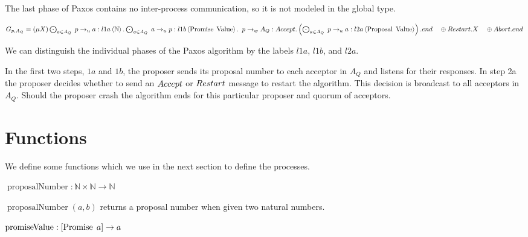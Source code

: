 The last phase of Paxos contains no inter-process communication, so it is not modeled in the global type.

$G_{p, A_Q} = \left(\mu X\right) \bigodot_{a \in A_Q}\; p \to_u a : l1a \left\langle \mathbb{N} \right\rangle . \bigodot_{a \in A_Q}\; a \to_u p : l1b \left\langle \operatorname{Promise}\; \operatorname{Value} \right\rangle .\\
\hspace*{0.5em}p \to_w A_Q : \mathnormal{Accept}.\left(\bigodot_{a \in A_Q}\; p \to_u a : l2a \left\langle \operatorname{Proposal}\; \operatorname{Value} \right\rangle\right).end\\
\hspace*{1em}\oplus \mathnormal{Restart}.X\\
\hspace*{1em}\oplus \mathnormal{Abort}.end$

We can distinguish the individual phases of the Paxos algorithm by the labels $l1a$, $l1b$, and $l2a$.

In the first two steps, $1a$ and $1b$, the proposer sends its proposal number to each acceptor in $A_Q$ and listens for their responses.
In step 2a the proposer decides whether to send an $\mathnormal{Accept}$ or $\mathnormal{Restart}$ message to restart the algorithm.
This decision is broadcast to all acceptors in $A_Q$.
Should the proposer crash the algorithm ends for this particular proposer and quorum of acceptors.

\section{Functions}
We define some functions which we use in the next section to define the processes.

\newcommand{\prNumber}[2]{\operatorname{proposalNumber}\left( #1, #2 \right)}
\newcommand{\promValue}[1]{\operatorname{promiseValue}\left(#1\right)}
\newcommand{\anyNack}[1]{\operatorname{anyNack}\left(#1\right)}
\newcommand{\promiseCount}[1]{\operatorname{promiseCount}\left(#1\right)}
\newcommand{\greaterThan}[2]{\operatorname{gt}\left(#1, #2\right)}
\newcommand{\greaterEqual}[2]{\operatorname{ge}\left(#1, #2\right)}
\newcommand{\nFromProposal}[1]{\operatorname{nFromProposal}\left(#1 \right)}
\newcommand{\genAq}[3]{\operatorname{genA_Q}\left(#1, #2, #3\right)}
\newcommand{\update}[2]{\operatorname{update} \left(#1, #2\right)}

$\operatorname{proposalNumber} : \mathbb{N} \times \mathbb{N} \to \mathbb{N}$

$\prNumber{a}{b}$ returns a proposal number when given two natural numbers.

$\operatorname{promiseValue} : [\operatorname{Promise}\; a] \to a$

